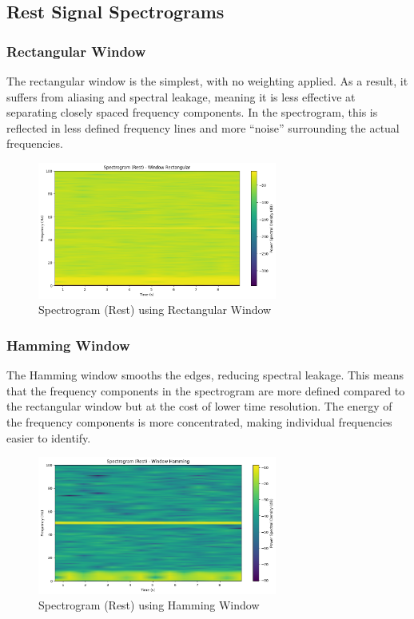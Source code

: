 \documentclass[10pt]{article}
\theoremstyle{definition}
\theoremstyle{remark}
\theoremstyle{definition}
\numberwithin{equation}{prob}
\begin{document}
\subsection*{Rest Signal Spectrograms}

\subsubsection{Rectangular Window}
The rectangular window is the simplest, with no weighting applied. As a result, it suffers from aliasing and spectral leakage, meaning it is less effective at separating closely spaced frequency components. In the spectrogram, this is reflected in less defined frequency lines and more ``noise'' surrounding the actual frequencies.

\begin{figure}[H]
    \centering
    \includegraphics[width=0.7\textwidth]{./figures/Spectrogram Rest Window Rectangular.png}
    \caption{Spectrogram (Rest) using Rectangular Window}
\end{figure}

\subsubsection{Hamming Window}
The Hamming window smooths the edges, reducing spectral leakage. This means that the frequency components in the spectrogram are more defined compared to the rectangular window but at the cost of lower time resolution. The energy of the frequency components is more concentrated, making individual frequencies easier to identify.

\begin{figure}[H]
    \centering
    \includegraphics[width=0.7\textwidth]{./figures/Spectrogram Rest Window Hamming.png}
    \caption{Spectrogram (Rest) using Hamming Window}
\end{figure}
\end{document}
